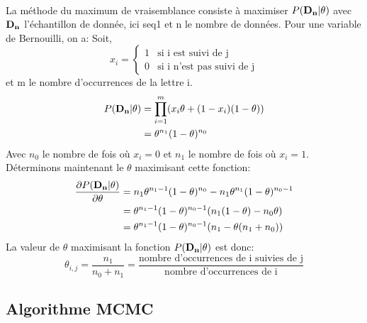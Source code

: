 \documentclass[11pt]{report}
\begin{document}
\paragraph{}
La méthode du maximum de vraisemblance consiste à maximiser $P(\bf{D}_n|\theta)$ avec $\bf{D}_n$ l'échantillon de donnée, ici seq1 et n le nombre de données. Pour une variable de Bernouilli, on a: Soit,\\ 
$$
\mbox{} x_i = \left\{
    \begin{array}{ll}
        1 & \mbox{si i est suivi de j} \\
        0 & \mbox{si i n'est pas suivi de j}
    \end{array}
\right.
$$
et m le nombre d’occurrences de la lettre i.
\begin{align*}
P(\bf{D}_n|\theta) &= \prod_{i = 1}^{m} (x_i \theta +(1-x_i)(1-\theta)) \\
                   &= \theta^{n_1} (1-\theta)^{n_0}
\end{align*}
Avec $n_0$ le nombre de fois où $x_i = 0$ et $n_1$ le nombre de fois où $x_i = 1$. Déterminons maintenant le $\theta$ maximisant cette fonction:
\begin{align*}
\frac{\partial P(\bf{D}_n|\theta)}{\partial \theta} 
&= n_1 \theta^{n_1-1} (1-\theta)^{n_0} - n_1\theta^{n_1} (1-\theta)^{n_0-1} \\
&= \theta^{n_1-1} (1-\theta)^{n_0-1} (n_1 (1-\theta) - n_0 \theta) \\
&= \theta^{n_1-1} (1-\theta)^{n_0-1} (n_1 - \theta (n_1 + n_0))
\end{align*}
La valeur de $\theta$ maximisant la fonction $P(\bf{D}_n|\theta)$ est donc:
$$ \theta_{i,j} = \frac{n_1}{n_0+n_1} = \frac{\mbox{nombre d'occurrences de i suivies de j}}{\mbox{nombre d'occurrences de i}} $$
\subsubsection{}
\subsubsection{}
\subsubsection{}
\subsubsection{}
\subsection{Algorithme MCMC}
\end{document}
